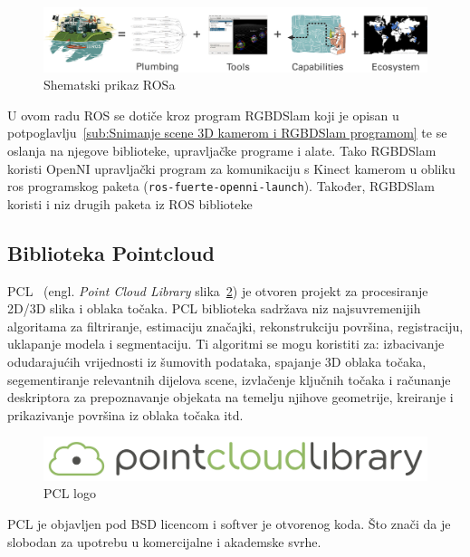 \begin{figure}[h]
\centering
\includegraphics[scale=0.45]{figures/ros.png}
\caption{Shematski prikaz ROSa}
\label{fig:ros.png}
\end{figure}

U ovom radu ROS se dotiče kroz program RGBDSlam koji je opisan u
potpoglavlju~\ref{sub:Snimanje scene 3D kamerom i RGBDSlam programom} te se oslanja na
njegove biblioteke, upravljačke programe i alate. Tako RGBDSlam koristi
OpenNI upravljački program za komunikaciju s Kinect kamerom u obliku ros
programskog paketa (\texttt{ros-fuerte-openni-launch}). Također, RGBDSlam
koristi i niz drugih paketa iz ROS biblioteke~\cite{web:rgbdslam}


\newpage
\subsection{Biblioteka Pointcloud} %
\label{sub:Biblioteka Pointcloud}

PCL~\cite{pcl} (engl. \textit{Point Cloud Library}
slika~\ref{fig:pcl.png}) je otvoren projekt za procesiranje 2D/3D slika
i oblaka točaka. PCL biblioteka sadržava niz najsuvremenijih algoritama
za filtriranje, estimaciju značajki, rekonstrukciju površina,
registraciju, uklapanje modela i segmentaciju.  Ti algoritmi se mogu
koristiti za: izbacivanje odudarajućih vrijednosti iz šumovith
podataka, spajanje 3D oblaka točaka, segementiranje relevantnih dijelova
scene, izvlačenje ključnih točaka i računanje deskriptora za
prepoznavanje objekata na temelju njihove geometrije, kreiranje i
prikazivanje površina iz oblaka točaka itd.

\begin{figure}[h]
\centering
\includegraphics[scale=0.15]{figures/pcl.png}
\caption{PCL logo}
\label{fig:pcl.png}
\end{figure}

PCL je objavljen pod BSD licencom i softver je otvorenog koda. Što znači
da je slobodan za upotrebu u komercijalne i akademske svrhe.

